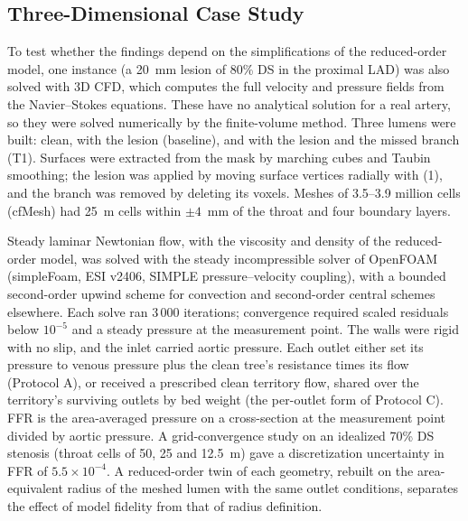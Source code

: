 \documentclass[journal]{IEEEtran}
\begin{document}
\subsection{Three-Dimensional Case Study}
To test whether the findings depend on the simplifications of the reduced-order model, one instance (a 20~mm lesion
of 80\% DS in the proximal LAD) was also solved with 3D CFD, which computes the full velocity and pressure fields
from the Navier--Stokes equations. These have no analytical solution for a real artery, so they were solved
numerically by the finite-volume method. Three lumens were built: clean, with the lesion (baseline), and with the
lesion and the missed branch (T1). Surfaces were extracted from the mask by marching cubes and Taubin smoothing; the
lesion was applied by moving surface vertices radially with (1), and the branch was removed by deleting its voxels.
Meshes of 3.5--3.9 million cells (cfMesh) had 25~\textmu m cells within $\pm 4$~mm of the throat and four boundary
layers.

Steady laminar Newtonian flow, with the viscosity and density of the reduced-order model, was solved with the
steady incompressible solver of OpenFOAM (simpleFoam, ESI v2406, SIMPLE pressure--velocity coupling), with a
bounded second-order upwind scheme for convection and second-order central schemes elsewhere. Each solve ran
3\,000 iterations; convergence required scaled residuals below $10^{-5}$ and a steady pressure at the measurement
point. The walls were rigid with no slip, and the inlet carried aortic pressure. Each outlet either set its pressure
to venous pressure plus the clean tree's resistance times its flow (Protocol A), or received a prescribed clean
territory flow, shared over the territory's surviving outlets by bed weight (the per-outlet form of Protocol C). FFR
is the area-averaged pressure on a cross-section at the measurement point divided by aortic pressure. A
grid-convergence study on an idealized 70\% DS stenosis (throat cells of 50, 25 and 12.5~\textmu m) gave a
discretization uncertainty in FFR of $5.5\times10^{-4}$. A reduced-order twin of each geometry, rebuilt on the
area-equivalent radius of the meshed lumen with the same outlet conditions, separates the effect of model fidelity
from that of radius definition.
\end{document}
